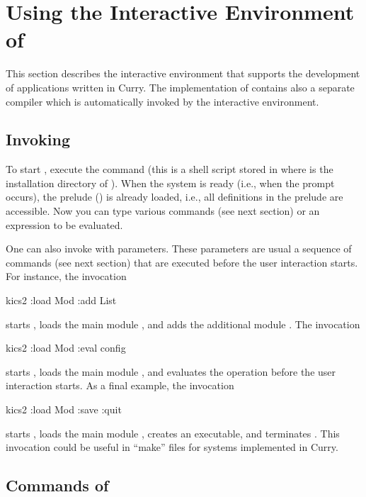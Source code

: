 \section{Using the Interactive Environment of \CYS}
\label{sec-kics2}

This section describes the interactive environment
\CYS\index{\CYS}
that supports the development of applications written in Curry.
The implementation of \CYS contains also a separate compiler
which is automatically invoked by the interactive environment.

\subsection{Invoking \CYS}
\label{sec:invoke-kics2}

To start \CYS, execute the command
(this is a shell script stored in
 where \cyshome is the installation directory
of \CYS).
When the system is ready (i.e., when the prompt  occurs),
the prelude ()
is already loaded, i.e., all definitions in the prelude are accessible.
Now you can type various commands (see next section)
or an expression to be evaluated.

One can also invoke \CYS with parameters.
These parameters are usual a sequence of commands
(see next section) that are executed before the user interaction
starts. For instance, the invocation
\begin{curry}
kics2 :load Mod :add List
\end{curry}
starts \CYS, loads the main module , and adds the additional
module .
The invocation
\begin{curry}
kics2 :load Mod :eval config
\end{curry}
starts \CYS, loads the main module , and evaluates
the operation  before the user interaction starts.
As a final example, the invocation
\begin{curry}
kics2 :load Mod :save :quit
\end{curry}
starts \CYS, loads the main module , creates an executable,
and terminates \CYS. This invocation could be useful in ``make'' files
for systems implemented in Curry.


\subsection{Commands of \CYS}
\label{sec:kics2-commands}

